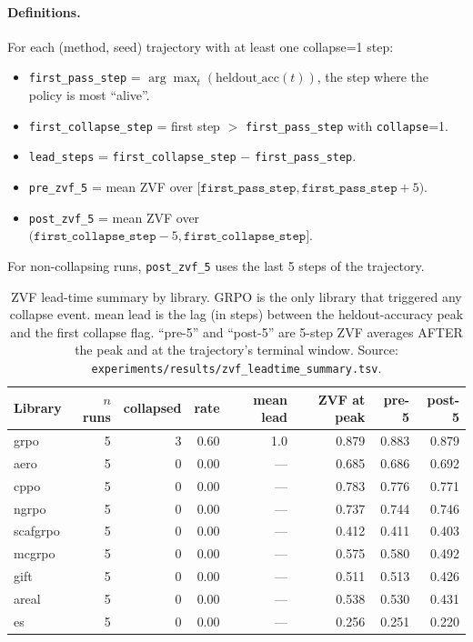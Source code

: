\documentclass{article}
\begin{document}
\paragraph{Definitions.}
For each (method, seed) trajectory with at least one collapse=1 step:
\begin{itemize}
\item \texttt{first\_pass\_step} = $\arg\max_{t}(\text{heldout\_acc}(t))$,
the step where the policy is most ``alive''.
\item \texttt{first\_collapse\_step} = first step $> $ \texttt{first\_pass\_step} with \texttt{collapse}=1.
\item \texttt{lead\_steps} = \texttt{first\_collapse\_step} $-$ \texttt{first\_pass\_step}.
\item \texttt{pre\_zvf\_5} = mean ZVF over $[\texttt{first\_pass\_step}, \texttt{first\_pass\_step}+5)$.
\item \texttt{post\_zvf\_5} = mean ZVF over $(\texttt{first\_collapse\_step}-5, \texttt{first\_collapse\_step}]$.
\end{itemize}
For non-collapsing runs, \texttt{post\_zvf\_5} uses the last 5 steps of
the trajectory.

\begin{table}[htbp]
\centering
\small
\begin{tabular}{lrrrrrrr}
\toprule
Library & $n$ runs & collapsed & rate & mean lead & ZVF at peak & pre-5 & post-5 \\
\midrule
grpo       & 5 & 3 & 0.60 & 1.0  & 0.879 & 0.883 & 0.879 \\
aero       & 5 & 0 & 0.00 & ---  & 0.685 & 0.686 & 0.692 \\
cppo       & 5 & 0 & 0.00 & ---  & 0.783 & 0.776 & 0.771 \\
ngrpo      & 5 & 0 & 0.00 & ---  & 0.737 & 0.744 & 0.746 \\
scafgrpo   & 5 & 0 & 0.00 & ---  & 0.412 & 0.411 & 0.403 \\
mcgrpo     & 5 & 0 & 0.00 & ---  & 0.575 & 0.580 & 0.492 \\
gift       & 5 & 0 & 0.00 & ---  & 0.511 & 0.513 & 0.426 \\
areal      & 5 & 0 & 0.00 & ---  & 0.538 & 0.530 & 0.431 \\
es         & 5 & 0 & 0.00 & ---  & 0.256 & 0.251 & 0.220 \\
\bottomrule
\end{tabular}
\caption{ZVF lead-time summary by library. GRPO is the only library
that triggered any collapse event. mean lead is the lag (in steps)
between the heldout-accuracy peak and the first collapse flag.
``pre-5'' and ``post-5'' are 5-step ZVF averages AFTER the peak and
at the trajectory's terminal window. Source:
\texttt{experiments/results/zvf\_leadtime\_summary.tsv}.}
\label{tab:zvf-leadtime}
\end{table}
\end{document}

